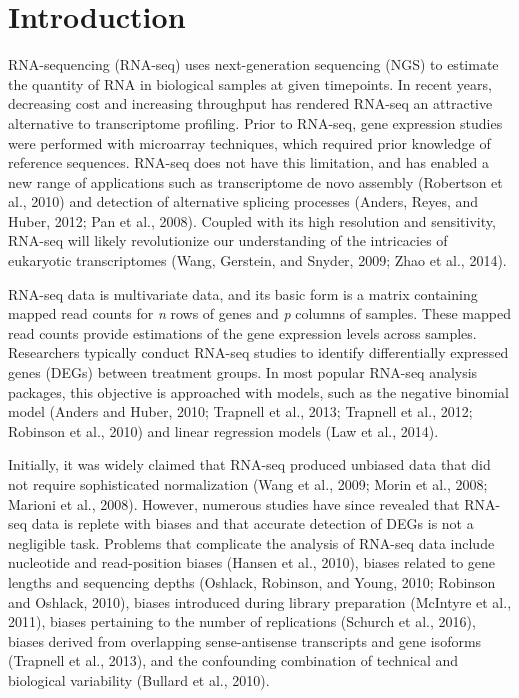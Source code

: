 \documentclass[useAMS,referee]{biom}
\begin{document}
\section{Introduction}
\label{s:Introduction}

RNA-sequencing (RNA-seq) uses next-generation sequencing (NGS) to estimate the quantity of RNA in biological samples at given timepoints. In recent years, decreasing cost and increasing throughput has rendered RNA-seq an attractive alternative to transcriptome profiling. Prior to RNA-seq, gene expression studies were performed with microarray techniques, which required prior knowledge of reference sequences. RNA-seq does not have this limitation, and has enabled a new range of applications such as transcriptome de novo assembly (Robertson et al., 2010) and detection of alternative splicing processes (Anders, Reyes, and Huber, 2012; Pan et al., 2008). Coupled with its high resolution and sensitivity, RNA-seq will likely revolutionize our understanding of the intricacies of eukaryotic transcriptomes (Wang, Gerstein, and Snyder, 2009; Zhao et al., 2014).

RNA-seq data is multivariate data, and its basic form is a matrix containing mapped read counts for \textit{n} rows of genes and \textit{p} columns of samples. These mapped read counts provide estimations of the gene expression levels across samples. Researchers typically conduct RNA-seq studies to identify differentially expressed genes (DEGs) between treatment groups. In most popular RNA-seq analysis packages, this objective is approached with models, such as the negative binomial model (Anders and Huber, 2010; Trapnell et al., 2013; Trapnell et al., 2012; Robinson et al., 2010) and linear regression models (Law et al., 2014).

Initially, it was widely claimed that RNA-seq produced unbiased data that did not require sophisticated normalization (Wang et al., 2009; Morin et al., 2008; Marioni et al., 2008). However, numerous studies have since revealed that RNA-seq data is replete with biases and that accurate detection of DEGs is not a negligible task. Problems that complicate the analysis of RNA-seq data include nucleotide and read-position biases (Hansen et al., 2010), biases related to gene lengths and sequencing depths (Oshlack, Robinson, and Young, 2010; Robinson and Oshlack, 2010), biases introduced during library preparation (McIntyre et al., 2011), biases pertaining to the number of replications (Schurch et al., 2016), biases derived from overlapping sense-antisense transcripts and gene isoforms (Trapnell et al., 2013), and the confounding combination of technical and biological variability (Bullard et al., 2010).
\end{document}
